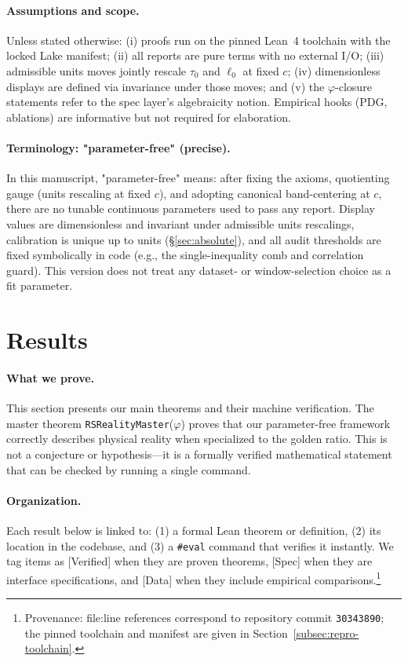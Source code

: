 \documentclass[11pt,a4paper,twoside]{article}
\numberwithin{equation}{section}
\theoremstyle{customthm}
\theoremstyle{customdef}
\theoremstyle{customrem}
\begin{document}
\paragraph{Assumptions and scope.} Unless stated otherwise: (i) proofs run on the pinned Lean~4 toolchain with the locked Lake manifest; (ii) all reports are pure terms with no external I/O; (iii) admissible units moves jointly rescale $\tau_0$ and $\ell_0$ at fixed $c$; (iv) dimensionless displays are defined via invariance under those moves; and (v) the $\varphi$-closure statements refer to the spec layer's algebraicity notion. Empirical hooks (PDG, ablations) are informative but not required for elaboration.

\paragraph{Terminology: "parameter-free" (precise).} In this manuscript, "parameter-free" means: after fixing the axioms, quotienting gauge (units rescaling at fixed $c$), and adopting canonical band-centering at $c$, there are no tunable continuous parameters used to pass any report. Display values are dimensionless and invariant under admissible units rescalings, calibration is unique up to units (\S\ref{sec:absolute}), and all audit thresholds are fixed symbolically in code (e.g., the single-inequality comb and correlation guard). This version does not treat any dataset- or window-selection choice as a fit parameter.

\section{Results}\label{sec:certificates}

\paragraph{What we prove.} This section presents our main theorems and their machine verification. The master theorem \texttt{RSRealityMaster}($\varphi$) proves that our parameter-free framework correctly describes physical reality when specialized to the golden ratio. This is not a conjecture or hypothesis—it is a formally verified mathematical statement that can be checked by running a single command. 

\paragraph{Organization.} Each result below is linked to: (1) a formal Lean theorem or definition, (2) its location in the codebase, and (3) a \texttt{\#eval} command that verifies it instantly. We tag items as [Verified] when they are proven theorems, [Spec] when they are interface specifications, and [Data] when they include empirical comparisons.\footnote{Provenance: file:line references correspond to repository commit \texttt{30343890}; the pinned toolchain and manifest are given in Section~\ref{subsec:repro-toolchain}.}
\end{document}
